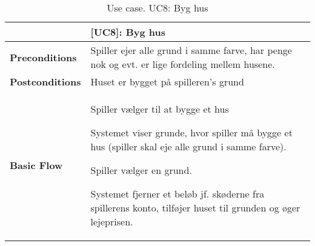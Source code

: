 \documentclass[class=article, crop=false]{standalone}
\begin{document}
    \begin{table}[H]
        \caption{Use case. UC8: Byg hus}
        \begin{tabularx}{\textwidth}{|l|X|}
            \hline
            & \textbf{[UC8]: Byg hus}   \\ \hline
            \textbf{Preconditions}       & Spiller ejer alle grund i samme farve, har penge nok og evt. er lige fordeling mellem husene.\\ \hline
            \textbf{Postconditions}      & Huset er bygget på spilleren's grund\\ \hline


            \textbf{Basic Flow} & \begin{tabenum}
                                      \item Spiller vælger til at bygge et hus
                                      \item Systemet viser grunde, hvor spiller må bygge et hus (spiller skal eje alle grund i samme farve).
                                      \item Spiller vælger en grund.
                                      \item Systemet fjerner et beløb jf. skøderne fra spillerens konto, tilføjer huset til grunden
                                            og øger lejeprisen.
            \end{tabenum}   \\ \hline

        \end{tabularx}


    \end{table}
\end{document}

